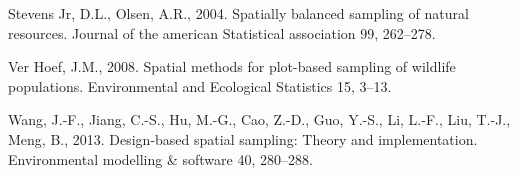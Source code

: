 \documentclass[]{elsarticle} %
\begin{document}
\leavevmode\hypertarget{ref-stevens2004spatially}{}%
Stevens Jr, D.L., Olsen, A.R., 2004. Spatially balanced sampling of
natural resources. Journal of the american Statistical association 99,
262--278.

\leavevmode\hypertarget{ref-verhoef2008spatial}{}%
Ver Hoef, J.M., 2008. Spatial methods for plot-based sampling of
wildlife populations. Environmental and Ecological Statistics 15, 3--13.

\leavevmode\hypertarget{ref-wang2013design}{}%
Wang, J.-F., Jiang, C.-S., Hu, M.-G., Cao, Z.-D., Guo, Y.-S., Li, L.-F.,
Liu, T.-J., Meng, B., 2013. Design-based spatial sampling: Theory and
implementation. Environmental modelling \& software 40, 280--288.
\end{document}
